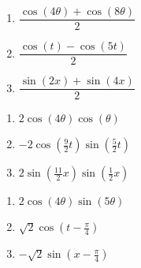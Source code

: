 \documentclass{ximera}
\begin{document}
\begin{multicols}{3}

\begin{enumerate}

\setcounter{enumi}{\value{HW}}

\item $\dfrac{\cos(4\theta) + \cos(8\theta)}{2}$
\item  $\dfrac{\cos(t) - \cos(5t)}{2}$
\item  $\dfrac{\sin(2x) + \sin(4x)}{2}$

\setcounter{HW}{\value{enumi}}

\end{enumerate}

\end{multicols}

\begin{multicols}{3}

\begin{enumerate}

\setcounter{enumi}{\value{HW}}

\item $2\cos(4\theta)\cos(\theta)$
\item $-2\cos \left( \frac{9}{2}t \right) \sin \left( \frac{5}{2}t \right)$
\item $2\sin \left( \frac{11}{2}x \right) \sin \left( \frac{1}{2}x \right)$

\setcounter{HW}{\value{enumi}}

\end{enumerate}

\end{multicols}

\begin{multicols}{3}

\begin{enumerate}

\setcounter{enumi}{\value{HW}}

\item $2\cos(4\theta)\sin(5\theta)$
\item $\sqrt{2}\cos \left(t - \frac{\pi}{4} \right)$
\item $-\sqrt{2}\sin \left(x - \frac{\pi}{4} \right)$

\setcounter{HW}{\value{enumi}}

\end{enumerate}

\end{multicols}
\end{document}
